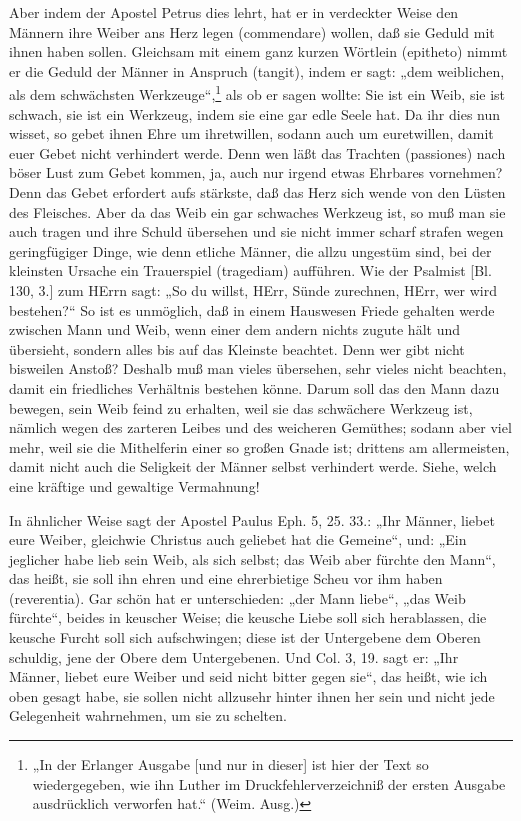 Aber indem der Apostel Petrus dies lehrt, hat er in verdeckter Weise den Männern ihre Weiber ans Herz legen (commendare) wollen, daß sie Geduld mit ihnen haben sollen. Gleichsam mit einem ganz kurzen Wörtlein (epitheto) nimmt er die Geduld der Männer in Anspruch (tangit), indem er sagt: „dem weiblichen, als dem schwächsten Werkzeuge“,\footnote{„In der Erlanger Ausgabe [und nur in dieser] ist hier der Text so wiedergegeben, wie ihn Luther im Druckfehlerverzeichniß der ersten Ausgabe ausdrücklich verworfen hat.“ (Weim. Ausg.)} als ob er sagen wollte: Sie ist ein Weib, sie ist schwach, sie ist ein Werkzeug, indem sie eine gar edle Seele hat. Da ihr dies nun wisset, so gebet ihnen Ehre um ihretwillen, sodann auch um euretwillen, damit euer Gebet nicht verhindert werde. Denn wen läßt das Trachten (passiones) nach böser Lust zum Gebet kommen, ja, auch nur irgend etwas Ehrbares vornehmen? Denn das Gebet erfordert aufs stärkste, daß das Herz sich wende von den Lüsten des Fleisches. Aber da das Weib ein gar schwaches Werkzeug ist, so muß man sie auch tragen und ihre Schuld übersehen und sie nicht immer scharf strafen wegen geringfügiger Dinge, wie denn etliche Männer, die allzu ungestüm sind, bei der kleinsten Ursache ein Trauerspiel (tragediam) aufführen. Wie der Psalmist [Bl. 130, 3.] zum HErrn sagt: „So du willst, HErr, Sünde zurechnen, HErr, wer wird bestehen?“ So ist es unmöglich, daß in einem Hauswesen Friede gehalten werde zwischen Mann und Weib, wenn einer dem andern nichts zugute hält und übersieht, sondern alles bis auf das Kleinste beachtet. Denn wer gibt nicht bisweilen Anstoß? Deshalb muß man vieles übersehen, sehr vieles nicht beachten, damit ein friedliches Verhältnis bestehen könne. Darum soll das den Mann dazu bewegen, sein Weib feind zu erhalten, weil sie das schwächere Werkzeug ist, nämlich wegen des zarteren Leibes und des weicheren Gemüthes; sodann aber viel mehr, weil sie die Mithelferin einer so großen Gnade ist; drittens am allermeisten, damit nicht auch die Seligkeit der Männer selbst verhindert werde. Siehe, welch eine kräftige und gewaltige Vermahnung!

In ähnlicher Weise sagt der Apostel Paulus Eph. 5, 25. 33.: „Ihr Männer, liebet eure Weiber, gleichwie Christus auch geliebet hat die Gemeine“, und: „Ein jeglicher habe lieb sein Weib, als sich selbst; das Weib aber fürchte den Mann“, das heißt, sie soll ihn ehren und eine ehrerbietige Scheu vor ihm haben (reverentia). Gar schön hat er unterschieden: „der Mann liebe“, „das Weib fürchte“, beides in keuscher Weise; die keusche Liebe soll sich herablassen, die keusche Furcht soll sich aufschwingen; diese ist der Untergebene dem Oberen schuldig, jene der Obere dem Untergebenen. Und Col. 3, 19. sagt er: „Ihr Männer, liebet eure Weiber und seid nicht bitter gegen sie“, das heißt, wie ich oben gesagt habe, sie sollen nicht allzusehr hinter ihnen her sein und nicht jede Gelegenheit wahrnehmen, um sie zu schelten.

